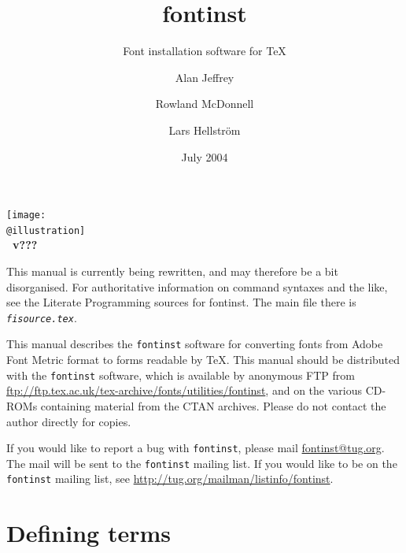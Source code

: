 \documentclass[a4paper]{ltxguide}
\title{fontinst}
\subtitle{Font installation software for \TeX}
\author{Alan Jeffrey\and Rowland McDonnell\and Lars Hellstr\"om}
\date{July 2004}
\makeatletter
\newcommand{\@subtitle}{}
\newcommand{\@version}{???}
\newcommand{\@illustration}{cover.eps}
\renewcommand{\maketitle}{{%
   \thispagestyle{empty}%
   \normalfont\centering
   \null
   {\fontsize{100}{100}\textit{\@title}}%
   \par\bigskip
   {\Large\textbf{\@subtitle}}%
   \vfill
   \texttt{[image: \\@illustration]}%
   \vfill
   {\Large\textbf{%
      \def\and{\egroup\qquad\hbox\bgroup}
      \leavevmode \hbox{\@author}\\[\smallskipamount] 
      \@title~v\@version
      \quad\textperiodcentered\quad \@date}}%
   \clearpage
}}
\newcommand*{\setfilename}[1]{\texttt{#1}}
\newcommand*{\setpackagename}[1]{\textsf{#1}}
\newcommand{\fontinst}{\setpackagename{font\-inst}\xspace}
\newcommand{\Fontinst}{\setpackagename{Font\-inst}\xspace}
\newcommand{\vf} {\setfilename{vf}\xspace}
\makeatother
\begin{document}
\maketitle

\begin{itshape}
  This manual is currently being rewritten, and may therefore be a 
  bit disorganised. For authoritative information on command syntaxes 
  and the like, see the Literate Programming sources for 
  \fontinst. The main file there is \textsl{\texttt{fisource.tex}}.
\end{itshape}

\bigskip

\begin{footnotesize}
  This manual describes the \texttt{fontinst} software for converting
  fonts from Adobe Font Metric format to forms readable by \TeX.  This
  manual should be distributed with the \texttt{fontinst} software,
  which is available by anonymous FTP from
  \url{ftp://ftp.tex.ac.uk/tex-archive/fonts/utilities/fontinst}, and
  on the various CD-ROMs containing material from the CTAN archives.
  Please do not contact the author directly for copies.

  If you would like to report a bug with \texttt{fontinst}, please
  mail \url{fontinst@tug.org}.  The mail will be sent to the
  \texttt{fontinst} mailing list.  If you would like to be on the
  \texttt{fontinst} mailing list, see 
  \url{http://tug.org/mailman/listinfo/fontinst}.
\end{footnotesize}

\tableofcontents


\clearpage


% 
% 
% 
% 


\section{Defining terms}
\end{document}
